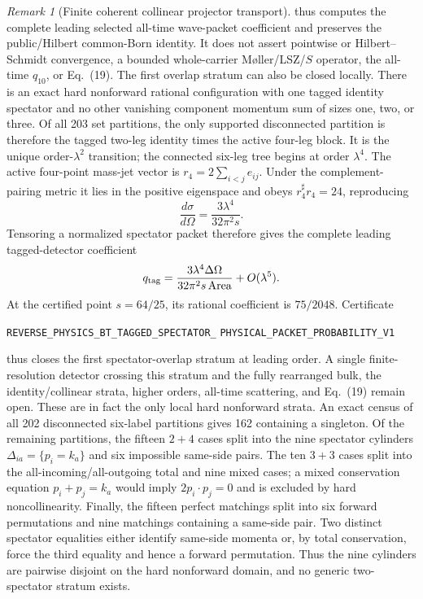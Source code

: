 \documentclass[11pt]{article}
\theoremstyle{definition}
\theoremstyle{remark}
\newtheorem{remark}[theorem]{Remark}
\begin{document}
\begin{remark}[Finite coherent collinear projector transport]
\par\noindent
thus computes the complete leading selected all-time wave-packet
coefficient and preserves the public/Hilbert common-Born identity.  It does
not assert pointwise or Hilbert--Schmidt convergence, a bounded whole-carrier
Møller/LSZ/\(S\) operator, the all-time \(q_{10}\), or Eq.~(19).
The first overlap stratum can also be closed locally.  There is an exact hard
nonforward rational configuration with one tagged identity spectator and no
other vanishing component momentum sum of sizes one, two, or three.  Of all
203 set partitions, the only supported disconnected partition is therefore
the tagged two-leg identity times the active four-leg block.  It is the unique
order-$\lambda^2$ transition; the connected six-leg tree begins at
order $\lambda^4$.  The active four-point mass-jet vector is
$r_4=2\sum_{i<j}e_{ij}$.  Under the complement-pairing metric it lies in the
positive eigenspace and obeys $r_4^\sharp r_4=24$, reproducing
\[
 \frac{d\sigma}{d\Omega}=\frac{3\lambda^4}{32\pi^2s}.
\]
Tensoring a normalized spectator packet therefore gives the complete leading
tagged-detector coefficient
\[
 q_{\rm tag}=\frac{3\lambda^4\Delta\Omega}
 {32\pi^2s\,\mathrm{Area}}+O(\lambda^5).
\]
At the certified point $s=64/25$, its rational coefficient is $75/2048$.
Certificate
\par\noindent
\texttt{REVERSE\_PHYSICS\_BT\_TAGGED\_SPECTATOR\_}
\allowbreak\texttt{PHYSICAL\_PACKET\_PROBABILITY\_V1}
\par\noindent
thus closes the first spectator-overlap stratum at leading order.  A single
finite-resolution detector crossing this stratum and the fully rearranged
bulk, the identity/collinear strata, higher orders, all-time scattering, and
Eq.~(19) remain open.
These are in fact the only local hard nonforward strata.  An exact census of
all 202 disconnected six-label partitions gives 162 containing a singleton.
Of the remaining partitions, the fifteen $2+4$ cases split into the nine
spectator cylinders $\Delta_{ia}=\{p_i=k_a\}$ and six impossible same-side
pairs.  The ten $3+3$ cases split into the all-incoming/all-outgoing total and
nine mixed cases; a mixed conservation equation $p_i+p_j=k_a$ would imply
$2p_i\mathbin{\cdot}p_j=0$ and is excluded by hard noncollinearity.  Finally,
the fifteen perfect matchings split into six forward permutations and nine
matchings containing a same-side pair.  Two distinct spectator equalities
either identify same-side momenta or, by total conservation, force the third
equality and hence a forward permutation.  Thus the nine cylinders are
pairwise disjoint on the hard nonforward domain, and no generic
two-spectator stratum exists.


\end{remark}
\end{document}
